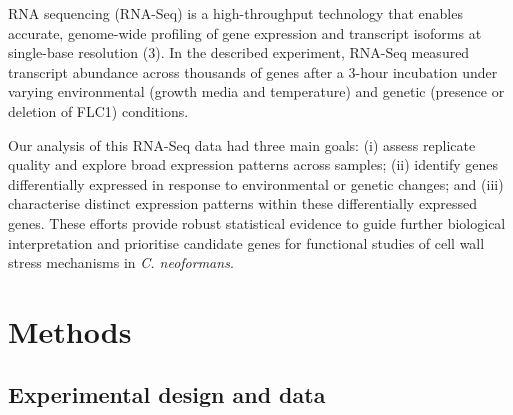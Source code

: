\documentclass[
  a4paper,
]{scrreprt}
\begin{document}
RNA sequencing (RNA-Seq) is a high-throughput technology that enables
accurate, genome-wide profiling of gene expression and transcript
isoforms at single-base resolution (3). In the described experiment,
RNA-Seq measured transcript abundance across thousands of genes after a
3-hour incubation under varying environmental (growth media and
temperature) and genetic (presence or deletion of FLC1) conditions.

Our analysis of this RNA-Seq data had three main goals: (i) assess
replicate quality and explore broad expression patterns across samples;
(ii) identify genes differentially expressed in response to
environmental or genetic changes; and (iii) characterise distinct
expression patterns within these differentially expressed genes. These
efforts provide robust statistical evidence to guide further biological
interpretation and prioritise candidate genes for functional studies of
cell wall stress mechanisms in \emph{C. neoformans}.


\chapter{Methods}\label{sec-methods}

\section{Experimental design and data}\label{sec-data}

\begin{table}

\caption{\label{tbl-01}Overview of the experimental design showing the
combinations of temperature and growth media (environmental conditions)
used to grow cells of the WT and FLC1Δ (FL) strains. Each cell lists the
replicate sample labels (S1--S30) corresponding to each unique
experimental condition.}


\end{table}%
\end{document}
